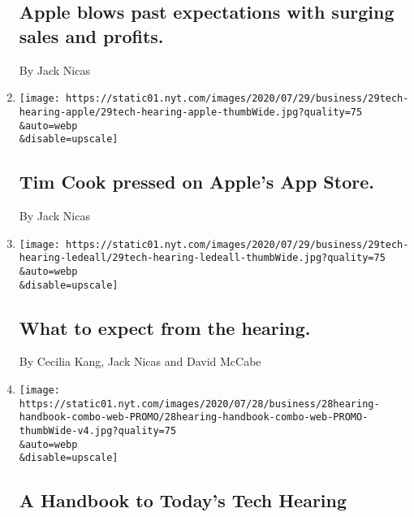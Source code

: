 \begin{enumerate}
{  \subsection{Apple blows past expectations with surging sales and
  profits.}\label{apple-blows-past-expectations-with-surging-sales-and-profits}}

  By Jack Nicas
\item
  \href{/live/2020/07/29/technology/tech-ceos-hearing-testimony/tim-cook-pressed-on-apples-app-store}{}

  \texttt{[image: https://static01.nyt.com/images/2020/07/29/business/29tech-hearing-apple/29tech-hearing-apple-thumbWide.jpg?quality=75\\\&auto=webp\\\&disable=upscale]}

  \hypertarget{tim-cook-pressed-on-apples-app-store}{%
  \subsection{Tim Cook pressed on Apple's App
  Store.}\label{tim-cook-pressed-on-apples-app-store}}

  By Jack Nicas
\item
  \href{/live/2020/07/29/technology/tech-ceos-hearing-testimony/what-to-expect-from-the-hearing}{}

  \texttt{[image: https://static01.nyt.com/images/2020/07/29/business/29tech-hearing-ledeall/29tech-hearing-ledeall-thumbWide.jpg?quality=75\\\&auto=webp\\\&disable=upscale]}

  \hypertarget{what-to-expect-from-the-hearing}{%
  \subsection{What to expect from the
  hearing.}\label{what-to-expect-from-the-hearing}}

  By Cecilia Kang, Jack Nicas and David McCabe
\item
  \href{/2020/07/29/technology/tech-ceos-congress-what-to-know.html}{}

  \texttt{[image: https://static01.nyt.com/images/2020/07/28/business/28hearing-handbook-combo-web-PROMO/28hearing-handbook-combo-web-PROMO-thumbWide-v4.jpg?quality=75\\\&auto=webp\\\&disable=upscale]}

  \hypertarget{a-handbook-to-todays-tech-hearing}{%
  \subsection{A Handbook to Today's Tech
  Hearing}\label{a-handbook-to-todays-tech-hearing}}


\end{enumerate}
